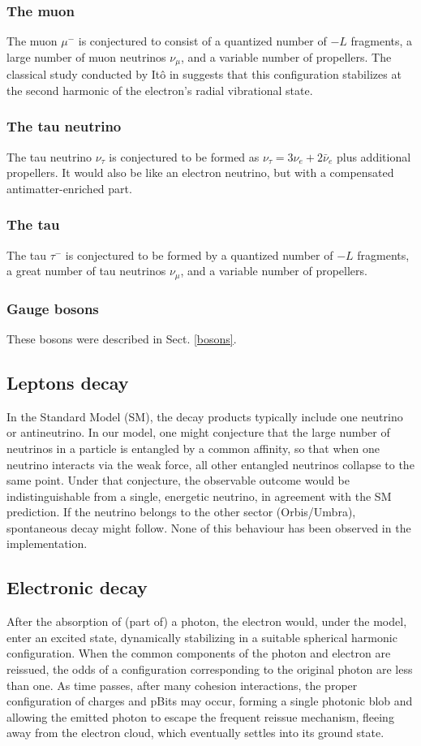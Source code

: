 \documentclass{ijuc}
\begin{document}
\subsubsection{The muon}  
The muon $\mu^-$ is conjectured to consist of a quantized number of $-L$ fragments, a large number of muon neutrinos $\nu_{\mu}$, and a variable number of propellers. 
The classical study conducted by Itô in \cite{ito} suggests that this configuration stabilizes at the second harmonic of the electron's radial vibrational state.

\subsubsection{The tau neutrino}
The tau neutrino $\nu_{\tau}$ is conjectured to be formed as $\nu_{\tau}=3\nu_e+2\bar{\nu}_e$ plus additional propellers. 
It would also be like an electron neutrino, but with a compensated antimatter-enriched part.

\subsubsection{The tau}
The tau $\tau^-$ is conjectured to be formed by a quantized number of $-L$ fragments, a great number of tau neutrinos $\nu_{\mu}$, and a variable number of propellers.

\subsubsection{Gauge bosons}
These bosons were described in Sect. \ref{bosons}.

\subsection{Leptons decay}
In the Standard Model (SM), the decay products typically include one neutrino or antineutrino.
In our model, one might conjecture that the large number of neutrinos in a particle is entangled by a common affinity, so that when one neutrino interacts via the weak force, all other entangled neutrinos collapse to the same point.
Under that conjecture, the observable outcome would be indistinguishable from a single, energetic neutrino, in agreement with the SM prediction.
If the neutrino belongs to the other sector (Orbis/Umbra), spontaneous decay might follow.  None of this behaviour has been observed in the implementation.

\subsection{Electronic decay}
After the absorption of (part of) a photon, the electron would, under the model, enter an excited state, dynamically stabilizing in a suitable spherical harmonic configuration. 
When the common components of the photon and electron are reissued, the odds of a configuration corresponding to the original photon are less than one. 
As time passes, after many cohesion interactions, the proper configuration of charges and pBits may occur, forming a single photonic blob and allowing the emitted photon to escape the frequent reissue mechanism, fleeing away from the electron cloud, which eventually settles into its ground state.
\end{document}
